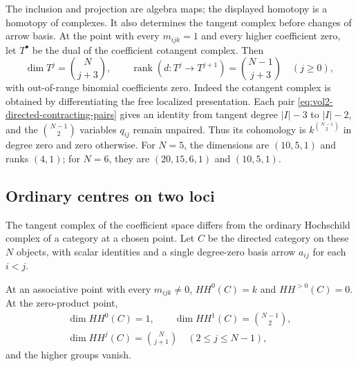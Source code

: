 The inclusion and projection are algebra maps; the
displayed homotopy is a homotopy of complexes. It also
determines the tangent complex before changes of arrow
basis. At the point with every $m_{ijk}=1$ and every higher
coefficient zero, let $T^\bullet$ be the dual of the
coefficient cotangent complex. Then
\begin{equation}\label{eq:vol2-directed-tangent-ranks}
 \dim T^j=\binom N{j+3},\qquad
 \operatorname{rank}(d:T^j\to T^{j+1})=\binom{N-1}{j+3}
 \quad(j\geq0),
\end{equation}
with out-of-range binomial coefficients zero. Indeed the
cotangent complex is obtained by differentiating the free
localized presentation. Each pair
\eqref{eq:vol2-directed-contracting-pairs} gives an identity
from tangent degree $|I|-3$ to $|I|-2$, and the
$\binom{N-1}{2}$ variables $q_{ij}$ remain unpaired.
Thus its cohomology is $k^{\binom{N-1}{2}}$ in degree zero
and zero otherwise. For $N=5$, the dimensions are
$(10,5,1)$ and ranks $(4,1)$; for $N=6$, they are
$(20,15,6,1)$ and $(10,5,1)$.

\subsection{Ordinary centres on two loci}

The tangent complex of the coefficient space differs from
the ordinary Hochschild complex of a category at a chosen
point. Let $C$ be the directed category on these $N$ objects,
with scalar identities and a single degree-zero basis arrow
$a_{ij}$ for each $i<j$.

\begin{proposition}\label{prop:vol2-directed-centre-loci}
At an associative point with every $m_{ijk}\ne0$,
$HH^0(C)=k$ and $HH^{>0}(C)=0$.
At the zero-product point,
\[
 \begin{gathered}
 \dim HH^0(C)=1,\qquad \dim HH^1(C)=\binom{N-1}{2},\\
 \dim HH^j(C)=\binom N{j+1}\quad(2\leq j\leq N-1),
 \end{gathered}
\]
and the higher groups vanish.
\end{proposition}

